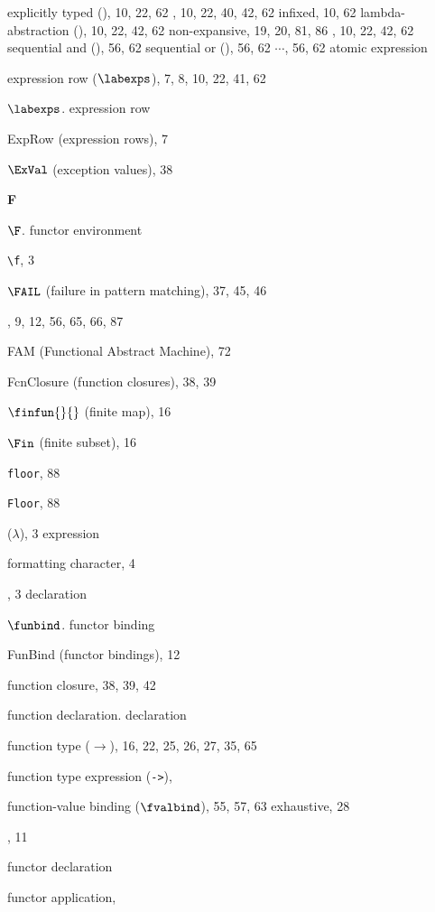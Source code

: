 \begin{theindex}
\subitem explicitly typed (\boxml{:}),  10, 22, 62
\subitem {}, 10, 22, 40, 42, 62
\subitem infixed, 10, 62
\subitem lambda-abstraction (), 10, 22, 42, 62
\subitem non-expansive, 19, 20, 81, 86
\subitem {}, 10, 22, 42, 62
\subitem sequential and (), 56, 62
\subitem sequential or (), 56, 62
\subitem {}$\cdots$, 56, 62
\subitem \seealso atomic expression
\item expression row ($\labexps$), 7, 8, 10, 22, 41, 62
\item $\labexps$. \see expression row
\item ExpRow (expression rows), 7
\item $\ExVal$ (exception values), 38
\indexspace
\parbox{64mm}{\hfil{\large\bf F}\hfil}
\indexspace
\item $\F$. \see functor environment
\item \verb+\f+, 3
\item $\FAIL$ (failure in pattern matching), 37, 45, 46
\item \FALSE, 9, 12, 56, 65, 66, 87
\item FAM (Functional Abstract Machine), 72
\item FcnClosure (function closures), 38, 39
\item $\finfun{}{}$ (finite map), 16
\item $\Fin$ (finite subset), 16
\item {\tt floor}, 88
\item {\tt Floor}, 88
\item \FN ($\lambda$), 3
\subitem \seealso expression
\item formatting character, 4
\item \FUN, 3
\subitem \seealso declaration
\item $\funbind$. \see functor binding
\item FunBind (functor bindings), 12
\item function closure, 38, 39, 42
\item function declaration. \see declaration
\item function type ($\rightarrow$), 16, 22, 25, 26, 27, 35, 65
\item function type expression (\verb+->+), \funtyperefs
\item function-value binding ($\fvalbind$), 55, 57, 63
\subitem exhaustive, 28
\item \FUNCTOR, 11
\item \seealso functor declaration
\item functor application, \funcapprefs

\end{theindex}
